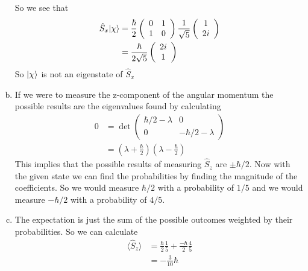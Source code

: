 \documentclass[11pt]{article}
\numberwithin{equation}{section}
\begin{document}
\begin{enumerate}[(a)]
So we see that
\begin{align*}
\hat{S}_x|{\chi}\rangle &= \frac{\hbar}{2}\left(\begin{array}{cc}
                                       0   &1\\                       
                                       1   &0                         
                                      \end{array}\right)
\frac{1}{\sqrt{5}}\left(\begin{array}{c}1\\ 2i\end{array}\right)\\
&= \frac{\hbar}{2\sqrt{5}}\left(\begin{array}{c}2i\\ 1\end{array}\right)
\end{align*}
So $|{\chi}\rangle$ is not an eigenstate of $\hat{S}_x$

\item
If we were to measure the z-component of the angular momentum the possible results are the eigenvalues found by calculating
\begin{align*}
0 &= \det\left(\begin{array}{cc}
                                       \hbar/2-\lambda   &0\\                        
                                       0   &-\hbar/2-\lambda                  
                                      \end{array}\right)\\
&= \left(\lambda + \frac{\hbar}{2}\right)\left(\lambda - \frac{\hbar}{2}\right)
\end{align*}
This implies that the possible results of measuring $\hat{S}_z$ are $\pm\hbar/2$. Now with the given state we can find the probabilities by finding the magnitude of the coefficients. So we would measure $\hbar/2$ with a probability of $1/5$ and we would measure $-\hbar/2$ with a probability of $4/5$.

\item
The expectation is just the sum of the possible outcomes weighted by their probabilities. So we can calculate
\begin{align*}
\langle\hat{S}_z\rangle &= \frac{\hbar}{2}\frac{1}{5} + \frac{-\hbar}{2}\frac{4}{5}\\
&= -\frac{3}{10}\hbar
\end{align*}

\end{enumerate}
\end{document}
